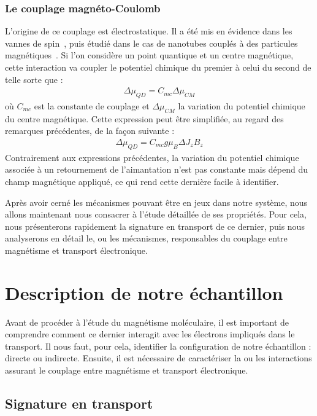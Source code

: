 \subsubsection{Le couplage magnéto-Coulomb}
L'origine de ce couplage est électrostatique. Il a été mis en évidence dans les vannes de spin~\cite{Molen2006}, puis étudié dans le cas de nanotubes couplés à des particules magnétiques~\cite{Datta2011}. Si l'on considère un point quantique et un centre magnétique, cette interaction va coupler le potentiel chimique du premier à celui du second de telle sorte que :
\begin{eqnarray}
\Delta \mu_{QD} = C_{mc} \Delta \mu_{CM}
\end{eqnarray}
où $C_{mc}$ est la constante de couplage et $\Delta \mu_{CM}$ la variation du potentiel chimique du centre magnétique. Cette expression peut être simplifiée, au regard des remarques précédentes, de la façon suivante :
\begin{eqnarray}
\Delta \mu_{QD} = C_{mc} g \mu_B  \Delta J_z B_z
\end{eqnarray}
Contrairement aux expressions précédentes, la variation du potentiel chimique associée à un retournement de l'aimantation n'est pas constante mais dépend du champ magnétique appliqué, ce qui rend cette dernière facile à identifier.

Après avoir cerné les mécanismes pouvant être en jeux dans notre système, nous allons maintenant nous consacrer à l'étude détaillée de ses propriétés. Pour cela, nous présenterons rapidement la signature en transport de ce dernier, puis nous analyserons en détail le, ou les mécanismes, responsables du couplage entre magnétisme et transport électronique.

\section{Description de notre échantillon}
Avant de procéder à l'étude du magnétisme moléculaire, il est important de comprendre comment ce dernier interagit avec les électrons impliqués dans le transport. Il nous faut, pour cela, identifier la configuration de notre échantillon : directe ou indirecte. Ensuite, il est nécessaire de caractériser la ou les interactions assurant le couplage entre magnétisme et transport électronique.


\subsection{Signature en transport}

